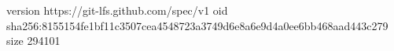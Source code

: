 version https://git-lfs.github.com/spec/v1
oid sha256:8155154fe1bf11c3507cea4548723a3749d6e8a6e9d4a0ee6bb468aad443c279
size 294101
